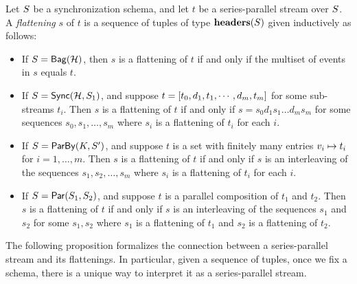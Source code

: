 \begin{definition}[Flattening]
    \label{45:def:sps-flattening}
    Let $\ss$ be a synchronization schema,
    and let $t$ be a series-parallel stream over $\ss$.
    A \emph{flattening} $s$ of $t$ is a sequence of tuples of type $\headers(\ss)$
    given inductively as follows:
\begin{itemize}
\item If $\ss = \relleaf{\mathcal{H}}$, then $s$ is a flattening of $t$ if and only if the multiset of events in $s$ equals $t$.
\item If $\ss = \hier{\mathcal{H}}{\ss_1}$, and suppose $t = \spsseq{t_0, d_1, t_1, \cdots, d_m, t_m}$ for some sub-streams
$t_i$.
Then $s$ is a flattening of $t$ if and only if $s = s_0 d_1 s_1 \ldots d_m s_m$ for some sequences $s_0, s_1, \ldots, s_m$ where $s_i$ is a flattening of $t_i$ for each $i$.
\item If $\ss = \keyby{K}{\ss'}$, and suppose $t$ is a set with finitely many entries $\keyed{v_i}{t_i}$ for $i = 1, \ldots, m$.
Then $s$ is a flattening of $t$ if and only if $s$ is an interleaving of the sequences $s_1, s_2, \ldots, s_m$
where $s_i$ is a flattening of $t_i$ for each $i$.
\item If $\ss = \parcomp{\ss_1}{\ss_2}$, and suppose $t$ is a parallel composition of $t_1$ and $t_2$.
Then $s$ is a flattening of $t$ if and only if $s$ is an interleaving of the sequences $s_1$ and $s_2$ for some $s_1, s_2$ where $s_1$ is a flattening of $t_1$ and $s_2$ is a flattening of $t_2$.
\end{itemize}
\end{definition}
The following proposition formalizes the connection between a series-parallel stream and its flattenings. In particular, given a sequence of tuples, once we fix a schema, there is a
unique way to interpret it as a series-parallel stream.

